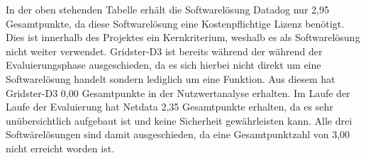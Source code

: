 {\begin{table}[H]
\caption{Nutzwertanalyse Datadog, Gridster-D3 und Netdata}
\label{nwa_dgn}
\end{table}

In der oben stehenden Tabelle erhält die Softwarelösung Datadog nur 2,95
Gesamtpunkte, da diese Softwarelösung eine Kostenpflichtige Lizenz benötigt.
Dies ist innerhalb des Projektes ein Kernkriterium, weshalb es als
Softwarelösung nicht weiter verwendet. Gridster\hyp{}D3 ist bereits während der
während der Evaluierungsphase ausgeschieden, da es sich hierbei nicht direkt um
eine Softwarelösung handelt sondern lediglich um eine Funktion. Aus diesem
hat Gridster\hyp{}D3 0,00 Gesamtpunkte in der Nutzwertanalyse erhalten. Im Laufe der
Laufe der Evaluierung hat Netdata 2,35 Gesamtpunkte erhalten, da es sehr
unübersichtlich aufgebaut ist und keine Sicherheit gewährleisten kann. Alle
drei Softwärelösungen sind damit ausgeschieden, da eine Gesamtpunktzahl von
3,00 nicht erreicht worden ist.

}
